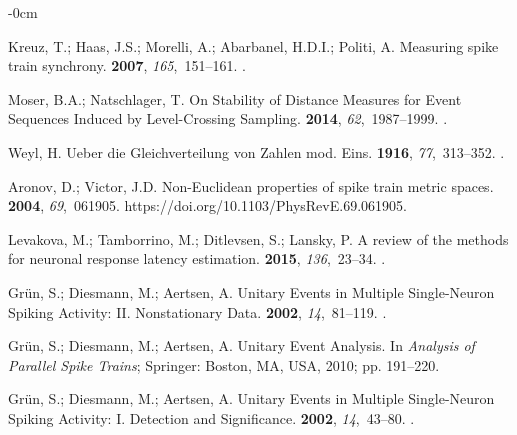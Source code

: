 \documentclass[brainsci, %
               review,accept,pdftex,moreauthors
               ]{Definitions/mdpi}
\begin{document}
\begin{adjustwidth}{-\extralength}{0cm}
\begin{thebibliography}{999}
Kreuz, T.; Haas, J.S.; Morelli, A.; Abarbanel, H.D.I.; Politi, A.
\newblock Measuring spike train synchrony.
 {\bf 2007}, {\em
  165},~151--161.
.

Moser, B.A.; Natschlager, T.
\newblock On {Stability} of {Distance} {Measures} for {Event} {Sequences}
  {Induced} by {Level}-{Crossing} {Sampling}.
 {\bf 2014}, {\em
  62},~1987--1999.
.

Weyl, H.
\newblock Ueber die {Gleichverteilung} von {Zahlen} mod. {Eins}.
 {\bf 1916}, {\em 77},~313--352.
.

Aronov, D.; Victor, J.D.
\newblock Non-{Euclidean} properties of spike train metric spaces.
 {\bf 2004}, {\em 69},~061905.
  {{https://doi.org/10.1103/PhysRevE.69.061905}}.

Levakova, M.; Tamborrino, M.; Ditlevsen, S.; Lansky, P.
\newblock A review of the methods for neuronal response latency estimation.
 {\bf 2015}, {\em 136},~23--34.
.

Grün, S.; Diesmann, M.; Aertsen, A.
\newblock Unitary {Events} in {Multiple} {Single}-{Neuron} {Spiking}
  {Activity}: {II}. {Nonstationary} {Data}.
 {\bf 2002}, {\em 14},~81--119.
.

Grün, S.; Diesmann, M.; Aertsen, A.
\newblock Unitary {Event} {Analysis}. In {\em Analysis of {Parallel} {Spike}
  {Trains}}; Springer: {Boston, MA, USA,} %
  2010; pp. 191--220.

Grün, S.; Diesmann, M.; Aertsen, A.
\newblock Unitary {Events} in {Multiple} {Single}-{Neuron} {Spiking}
  {Activity}: {I}. {Detection} and {Significance}.
 {\bf 2002}, {\em 14},~43--80.
.


\end{thebibliography}
\end{adjustwidth}
\end{document}

